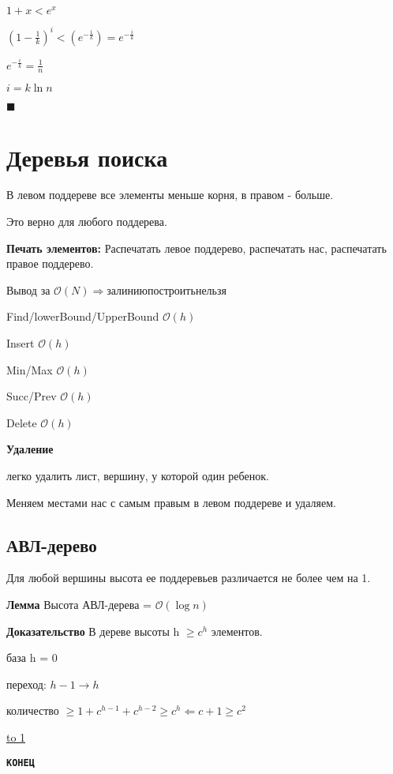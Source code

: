 \documentclass[12pt]{article}
\def\t{\texttt}
\def\O{\mathcal{O}}
\begin{document}
$1 + x < e^x$

$(1 - \frac{1}{k})^i < (e^{-\frac{1}{k}}) = e^{-\frac{i}{k}}$

$ e^{-\frac{i}{k}} = \frac{1}{n}$

$i = k \ln n$

$\blacksquare$

\section{Деревья поиска}

В левом поддереве все элементы меньше корня, в правом - больше. 

Это верно для любого поддерева.

{\bf Печать элементов:} Распечатать левое поддерево, распечатать нас, распечатать правое поддерево.

Вывод за $\O(N) \Rightarrow за линию построить нельзя$

Find/lowerBound/UpperBound $\O(h)$

Insert $\O(h)$

Min/Max $\O(h)$

Succ/Prev $\O(h)$

Delete $\O(h)$

{\bf Удаление}

легко удалить лист, вершину, у которой один ребенок.

Меняем местами нас с самым правым в левом поддереве и удаляем.


\subsection{АВЛ-дерево}

Для любой вершины высота ее поддеревьев различается не более чем на 1.

{\bf Лемма} Высота АВЛ-дерева = $\O(\log n)$

{\bf Доказательство} В дереве высоты h $\ge c^h$ элементов.

база h = 0

переход: $h - 1\to h$

количество $\ge 1 + c^{h - 1} + c^{h - 2} \ge c^h \Leftarrow c + 1 \ge c^2$ 

\noindent \underline{\hbox to 1\textwidth{{ } \hfil{ } \hfil{ } }}

\begin{center}
  \t{\Large{\bf КОНЕЦ}}
\end{center}
\end{document}
